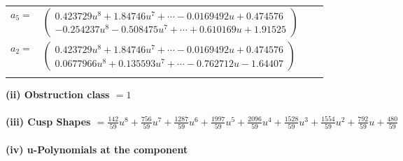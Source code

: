 \documentclass[1p]{elsarticle_modified}
\theoremstyle{definition}
\begin{document}
\begin{tabular}{m{7pt} m{180pt} m{7pt} m{180pt} }
\flushright $a_{5}=$&$\begin{pmatrix}0.423729 u^{8}+1.84746 u^{7}+\cdots-0.0169492 u+0.474576\\-0.254237 u^{8}-0.508475 u^{7}+\cdots+0.610169 u+1.91525\end{pmatrix}$ \\
\flushright $a_{2}=$&$\begin{pmatrix}0.423729 u^{8}+1.84746 u^{7}+\cdots-0.0169492 u+0.474576\\0.0677966 u^{8}+0.135593 u^{7}+\cdots-0.762712 u-1.64407\end{pmatrix}$\\&\end{tabular}
\flushleft \textbf{(ii) Obstruction class $= 1$}\\~\\
\flushleft \textbf{(iii) Cusp Shapes $= \frac{142}{59} u^8+\frac{756}{59} u^7+\frac{1287}{59} u^6+\frac{1997}{59} u^5+\frac{2096}{59} u^4+\frac{1528}{59} u^3+\frac{1554}{59} u^2+\frac{792}{59} u+\frac{480}{59}$}\\~\\
\newpage\renewcommand{\arraystretch}{1}
\flushleft \textbf{(iv) u-Polynomials at the component}\newline \\
\end{document}
